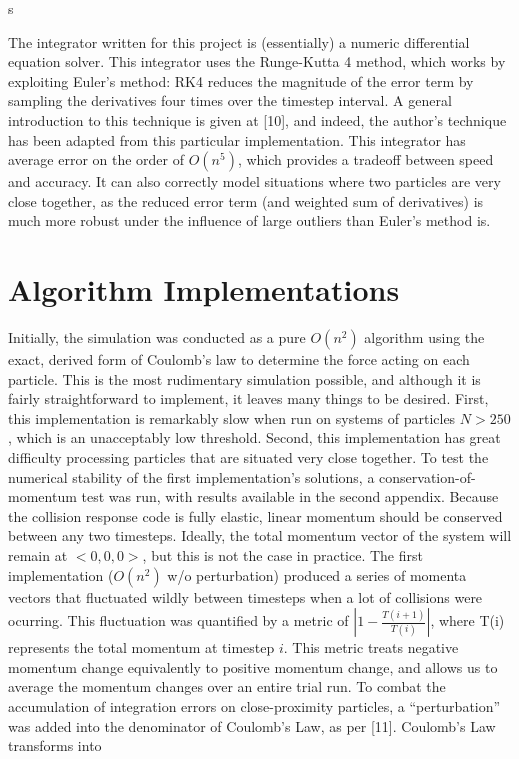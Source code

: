 s\documentclass[10pt]{article}
\begin{document}
The integrator written for this project is (essentially) a numeric differential equation solver. This integrator uses the Runge-Kutta 4 method, which works by exploiting Euler's method: RK4 reduces the magnitude of the error term by sampling the derivatives four times over the timestep interval. A general introduction to this technique is given at [10], and indeed, the author's technique has been adapted from this particular implementation. This integrator has average error on the order of $O(n^5)$, which provides a tradeoff between speed and accuracy. It can also correctly model situations where two particles are very close together, as the reduced error term (and weighted sum of derivatives) is much more robust under the influence of large outliers than Euler's method is.

\clearpage
\section{Algorithm Implementations}
Initially, the simulation was conducted as a pure $O(n^2)$ algorithm using the exact, derived form of Coulomb's law to determine the force acting on each particle. This is the most rudimentary simulation possible, and although it is fairly straightforward to implement, it leaves many things to be desired. First, this implementation is remarkably slow when run on systems of particles $N > 250$, which is an unacceptably low threshold. Second, this implementation has great difficulty processing particles that are situated very close together. To test the numerical stability of the first implementation's solutions, a conservation-of-momentum test was run, with results available in the second appendix. Because the collision response code is fully elastic, linear momentum should be conserved between any two timesteps. Ideally, the total momentum vector of the system will remain at $<0, 0, 0>$, but this is not the case in practice. The first implementation ($O(n^2)$ w/o perturbation) produced a series of momenta vectors that fluctuated wildly between timesteps when a lot of collisions were ocurring. This fluctuation was quantified by a metric of $|1 - \frac{T(i+1)}{T(i)}|$, where T(i) represents the total momentum at timestep $i$. This metric treats negative momentum change equivalently to positive momentum change, and allows us to average the momentum changes over an entire trial run. To combat the accumulation of integration errors on close-proximity particles, a ``perturbation'' was added into the denominator of Coulomb's Law, as per [11]. Coulomb's Law transforms into
\end{document}
